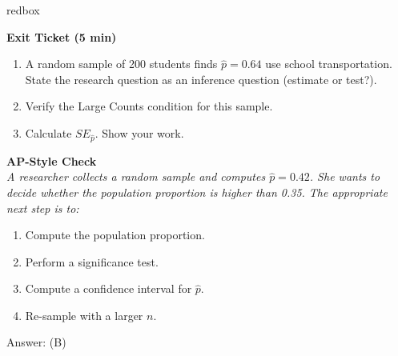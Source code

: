 \documentclass[10pt]{article}
\begin{document}
\begin{skillbox}{redbox}
\begin{minipage}[t]{0.48\linewidth}
    \textbf{Exit Ticket (5 min)}
    \begin{enumerate}
        \item A random sample of 200 students finds $\hat p = 0.64$ use school
              transportation. State the research question as an inference question
              (estimate or test?).
        \item Verify the Large Counts condition for this sample.
        \item Calculate $SE_{\hat p}$. Show your work.
    \end{enumerate}
\end{minipage}
\hfill
\begin{minipage}[t]{0.48\linewidth}
    \textbf{AP-Style Check}\\
    \textit{A researcher collects a random sample and computes $\hat p = 0.42$. She wants
    to decide whether the population proportion is higher than 0.35. The appropriate
    next step is to:}
    \begin{enumerate}[label=(\Alph*)]
        \item Compute the population proportion.
        \item Perform a significance test.
        \item Compute a confidence interval for $\hat p$.
        \item Re-sample with a larger $n$.
    \end{enumerate}
    Answer: (B)
\end{minipage}
\end{skillbox}
\end{document}
